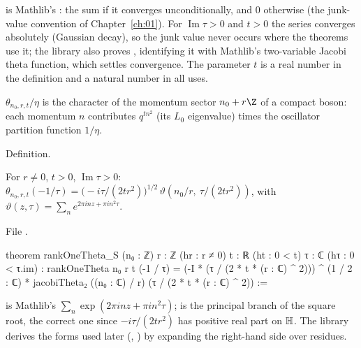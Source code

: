 \begin{dictionary}
 is Mathlib's : the sum if it converges unconditionally, and $0$ otherwise (the
junk-value convention of Chapter~\ref{ch:01}). For $\operatorname{Im}\tau>0$ and $t>0$ the series converges
absolutely (Gaussian decay), so the junk value never occurs where the theorems use it; the library also proves
, identifying it with Mathlib's two-variable Jacobi theta function, which
settles convergence. The parameter $t$ is a real number in the definition and a natural number in all uses.
\end{dictionary}

\begin{physics}
$\theta_{n_0,r,t}/\eta$ is the character of the momentum sector $n_0+r\Z$ of a compact boson: each momentum
$n$ contributes $q^{tn^2}$ (its $L_0$ eigenvalue) times the oscillator partition function $1/\eta$.
\end{physics}

\begin{status}
Definition.
\end{status}

\begin{theorem}\label{l22:thm:thetaS}
For $r\ne0$, $t>0$, $\operatorname{Im}\tau>0$:
$\theta_{n_0,r,t}(-1/\tau)=\bigl(-i\tau/(2tr^2)\bigr)^{1/2}\,\vartheta\!\left(n_0/r,\ \tau/(2tr^2)\right)$, with
$\vartheta(z,\tau)=\sum_n e^{2\pi i nz+\pi i n^2\tau}$.
\end{theorem}
\noindent File .
\begin{leancode}
theorem rankOneTheta_S (n₀ : ℤ) {r : ℤ} (hr : r ≠ 0) {t : ℝ} (ht : 0 < t) {τ : ℂ}
    (hτ : 0 < τ.im) :
    rankOneTheta n₀ r t (-1 / τ) =
      (-I * (τ / (2 * t * (r : ℂ) ^ 2))) ^ (1 / 2 : ℂ) *
        jacobiTheta₂ ((n₀ : ℂ) / r) (τ / (2 * t * (r : ℂ) ^ 2)) :=
\end{leancode}

\begin{dictionary}
 is Mathlib's $\sum_n\exp(2\pi i n z+\pi i n^2\tau)$;  is the
principal branch of the square root, the correct one since $-i\tau/(2tr^2)$ has positive real part on
$\mathbb{H}$. The library derives the forms used later (,
) by expanding the right-hand side over residues.
\end{dictionary}

